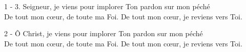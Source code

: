 1 - 3. Seigneur, je viens pour implorer Ton pardon sur mon péché\\
De tout mon cœur, de toute ma Foi. De tout mon cœur, je reviens vers Toi.

2 - Ô Christ, je viens pour implorer Ton pardon sur mon péché \\
De tout mon cœur, de toute ma Foi. De tout mon cœur, je reviens vers Toi.

